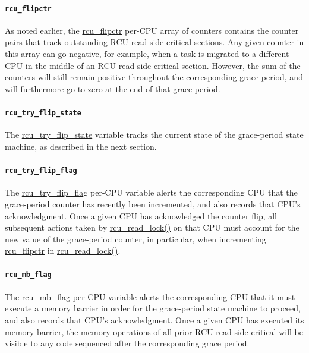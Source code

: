 \paragraph{{\tt rcu\_flipctr}}
\label{app:rcuimpl:rcu_flipctr}

As noted earlier, the \url{rcu_flipctr}
per-CPU array of counters contains the
counter pairs that track outstanding RCU read-side critical sections.
Any given counter in this array can go negative, for example, when
a task is migrated to a different CPU in the middle of an RCU
read-side critical section.
However, the sum of the counters will
still remain positive throughout the corresponding grace period, and will
furthermore go to zero at the end of that grace period.

\paragraph{{\tt rcu\_try\_flip\_state}}
\label{app:rcuimpl:rcu_try_flip_state}

The \url{rcu_try_flip_state} variable tracks the current state of
the grace-period state machine, as described in the next section.

\paragraph{{\tt rcu\_try\_flip\_flag}}
\label{app:rcuimpl:rcu_try_flip_flag}

The \url{rcu_try_flip_flag} per-CPU variable alerts the corresponding
CPU that the grace-period counter has recently been incremented, and
also records that CPU's acknowledgment.
Once a given CPU has acknowledged the counter flip, all subsequent actions
taken by \url{rcu_read_lock()} on that CPU must account for the
new value of the grace-period counter, in particular, when incrementing
\url{rcu_flipctr} in \url{rcu_read_lock()}.

\paragraph{{\tt rcu\_mb\_flag}}
\label{app:rcuimpl:rcu_mb_flag}

The \url{rcu_mb_flag} per-CPU variable alerts the corresponding
CPU that it must execute a memory barrier in order for the grace-period
state machine to proceed, and also records that CPU's acknowledgment.
Once a given CPU has executed its memory barrier, the memory operations
of all prior RCU read-side critical will be visible to any code sequenced
after the corresponding grace period.


